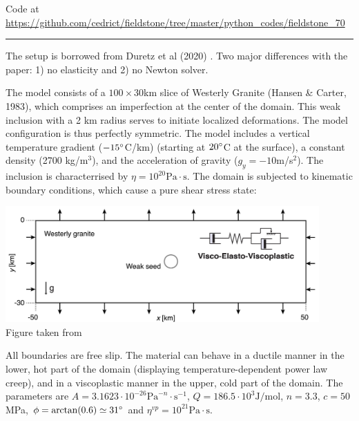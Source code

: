 

\begin{center}
Code at \url{https://github.com/cedrict/fieldstone/tree/master/python_codes/fieldstone_70}
\end{center}

\par\noindent\rule{\textwidth}{0.4pt}


The setup is borrowed from Duretz et al (2020) \cite{dudy20}. 
Two major differences with the paper: 1) no elasticity and 2) no Newton solver.

The model consists of a $100\times 30$km slice of Westerly Granite (Hansen \& Carter, 1983), 
which comprises an imperfection at the center of the domain.
This weak inclusion with a 2 km radius serves to initiate
localized deformations. The model configuration is thus perfectly symmetric. 
The model includes a vertical temperature gradient ($-15\degree$C/km) (starting 
at $20\degree$C at the surface), 
a constant density (2700 kg/m$^3$), and the acceleration of gravity ($g_y=-10$m/s$^2$).
The inclusion is characterrised by $\eta=10^{20}\text{Pa}\cdot \text{s}$.
The domain is subjected to kinematic boundary conditions, which cause a pure shear stress
state:

\begin{center}
\includegraphics[width=12cm]{python_codes/fieldstone_70/images/fig1}\\
{\captionfont Figure taken from \cite{dudy20}}
\end{center}

All boundaries are free slip. The material can behave in a ductile manner in the lower, hot
part of the domain (displaying temperature-dependent power law creep), and in a viscoplastic 
manner in the upper, cold part of the domain. 
The parameters are 
$A=3.1623\cdot 10^{-26}\text{Pa}^{-n}\cdot\text{s}^{-1}$, $Q=186.5\cdot 10^3 \text{J/mol}$, 
$n=3.3$, $c=50$MPa, $\phi=\arctan(0.6)\simeq 31\degree$ and $\eta^{vp}=10^{21}\text{Pa}\cdot\text{s}$. 

